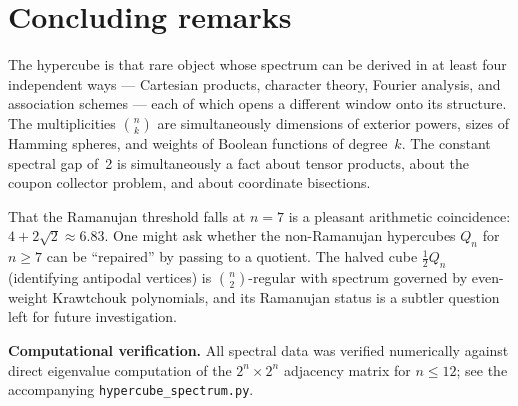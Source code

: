 \documentclass[11pt,a4paper]{article}
\theoremstyle{plain}
\theoremstyle{definition}
\theoremstyle{remark}
\begin{document}
\section{Concluding remarks}

The hypercube is that rare object whose spectrum can be derived in at least
four independent ways --- Cartesian products, character theory, Fourier
analysis, and association schemes --- each of which opens a different window
onto its structure. The multiplicities $\binom{n}{k}$ are simultaneously
dimensions of exterior powers, sizes of Hamming spheres, and weights of
Boolean functions of degree~$k$. The constant spectral gap of~2 is
simultaneously a fact about tensor products, about the coupon collector
problem, and about coordinate bisections.

That the Ramanujan threshold falls at $n = 7$ is a pleasant arithmetic
coincidence: $4 + 2\sqrt{2} \approx 6.83$. One might ask whether the
non-Ramanujan hypercubes $Q_n$ for $n \ge 7$ can be ``repaired'' by passing
to a quotient. The halved cube $\frac{1}{2}Q_n$ (identifying antipodal
vertices) is $\binom{n}{2}$-regular with spectrum governed by even-weight
Krawtchouk polynomials, and its Ramanujan status is a subtler question left
for future investigation.

\bigskip

{\raggedright\noindent\textbf{Computational verification.}
All spectral data was verified numerically against direct eigenvalue
computation of the $2^n \times 2^n$ adjacency matrix for $n \le 12$;
see the accompanying \texttt{hypercube\_spectrum.py}.\par}
\end{document}
